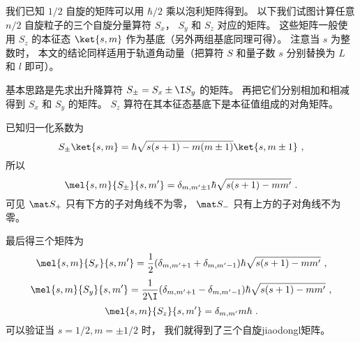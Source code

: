 

我们已知 $1/2$ 自旋的矩阵可以用 $\hbar/2$ 乘以泡利矩阵得到。 以下我们试图计算任意 $n/2$ 自旋粒子的三个自旋分量算符 $S_x$， $S_y$ 和 $S_z$ 对应的矩阵。 这些矩阵一般使用 $S_z$ 的本征态 $\ket{s, m}$ 作为基底（另外两组基底同理可得）。 注意当 $s$ 为整数时， 本文的结论同样适用于轨道角动量（把算符 $S$ 和量子数 $s$ 分别替换为 $L$ 和 $l$ 即可）。

基本思路是先求出升降算符 $S_\pm = S_x \pm \I S_y$ 的矩阵。 再把它们分别相加和相减得到 $S_x$ 和 $S_y$ 的矩阵。 $S_z$ 算符在其本征态基底下是本征值组成的对角矩阵。

已知归一化系数为
\begin{equation}
S_\pm \ket{s,m} = \hbar \sqrt{s(s + 1) - m(m \pm 1)} \ket{s,m\pm1}~,
\end{equation}
所以
\begin{equation}
\mel{s,m}{S_\pm}{s,m'} = \delta_{m, m'\pm1} \hbar \sqrt{s(s + 1) - mm'}~.
\end{equation}
可见 $\mat S_+$ 只有下方的子对角线不为零， $\mat S_-$ 只有上方的子对角线不为零。

最后得三个矩阵为
\begin{equation}
\mel{s,m}{S_x}{s,m'} = \frac12(\delta_{m, m'+1} + \delta_{m, m'-1})\hbar \sqrt{s(s + 1) - mm'} ~,
\end{equation}
\begin{equation}
\mel{s,m}{S_y}{s,m'} = \frac{1}{2\I}(\delta_{m, m'+1} - \delta_{m, m'-1}) \hbar \sqrt{s(s + 1) - mm'}~,
\end{equation}
\begin{equation}
\mel{s,m}{S_z}{s,m'} = \delta_{m,m'} m\hbar ~.
\end{equation}
可以验证当 $s = 1/2, m = \pm1/2$ 时， 我们就得到了三个自旋jiaodongl矩阵。
